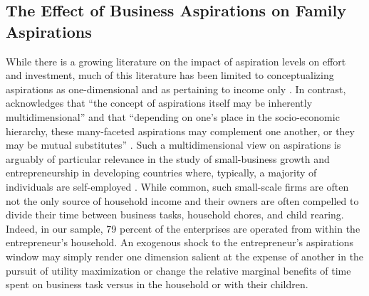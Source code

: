 \documentclass[11.5pt]{article}
\begin{document}

\subsection{The Effect of Business Aspirations on Family Aspirations}

While there is a growing literature on the impact of aspiration levels on effort and investment, much of this literature has been limited to conceptualizing aspirations as one-dimensional and as pertaining to income only \citep[see, e.g.,][]{Janzen2017, McBride2010, Stutzer2004, Knight2012}. In contrast, \citet{Ray2003, Ray2006} acknowledges that ``the concept of aspirations itself may be inherently multidimensional'' and that ``depending on one's place in the socio-economic hierarchy, these many-faceted aspirations may complement one another, or they may be mutual substitutes'' \citep[][p.2]{Ray2003}. Such a multidimensional view on aspirations is arguably of particular relevance in the study of small-business growth and entrepreneurship in developing countries where, typically, a majority of individuals are self-employed \citep[e.g.][]{Maloney2004, Gollin2008, Nichter2009}. While common, such small-scale firms are often not the only source of household income and their owners are often compelled to divide their time between business tasks, household chores, and child rearing. Indeed, in our sample, 79 percent of the enterprises are operated from within the entrepreneur's household. An exogenous shock to the entrepreneur's aspirations window may simply render one dimension salient at the expense of another in the pursuit of utility maximization or change the relative marginal benefits of time spent on business task versus in the household or with their children.
\end{document}
